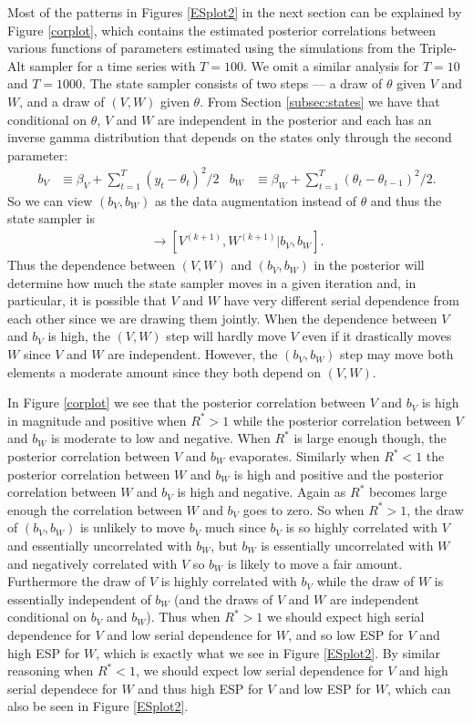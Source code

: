 \documentclass{article}
\begin{document}
\setcounter{figure}{0}    

Most of the patterns in Figures \ref{ESplot2} in the next section can be explained by Figure \ref{corplot}, which contains the estimated posterior correlations between various functions of parameters estimated using the simulations from the Triple-Alt sampler for a time series with $T=100$. We omit a similar analysis for $T=10$ and $T=1000$. The state sampler consists of two steps --- a draw of $\theta$ given $V$ and $W$, and a draw of $(V,W)$ given $\theta$. From Section \ref{subsec:states} we have that conditional on $\theta$, $V$ and $W$ are independent in the posterior and each has an inverse gamma distribution that depends on the states only through the second parameter:
\begin{align*}
  b_V &\equiv \beta_V + \sum_{t=1}^T(y_t - \theta_t)^2/2 &
  b_W &\equiv \beta_W + \sum_{t=1}^T(\theta_t - \theta_{t-1})^2/2.
\end{align*}
So we can view $(b_V,b_W)$ as the data augmentation instead of $\theta$ and thus the state sampler is
\begin{align*}
  [b_V, b_W|V^{(k)},W^{(k)}] \to [V^{(k+1)},W^{(k+1)}|b_V,b_W].
\end{align*}
Thus the dependence between $(V,W)$ and $(b_V,b_W)$ in the posterior will determine how much the state sampler moves in a given iteration and, in particular, it is possible that $V$ and $W$ have very different serial dependence from each other since we are drawing them jointly. When the dependence between $V$ and $b_V$ is high, the $(V,W)$ step will hardly move $V$ even if it drastically moves $W$ since $V$ and $W$ are independent. However, the $(b_V,b_W)$ step may move both elements a moderate amount since they both depend on $(V,W)$.

In Figure \ref{corplot} we see that the posterior correlation between $V$ and $b_V$ is high in magnitude and positive when $R^*>1$ while the posterior correlation between $V$ and $b_W$ is moderate to low and negative. When $R^*$ is large enough though, the posterior correlation between $V$ and $b_W$ evaporates. Similarly when $R^*<1$ the posterior correlation between $W$ and $b_W$ is high and positive and the posterior correlation between $W$ and $b_V$ is high and negative. Again as $R^*$ becomes large enough the correlation between $W$ and $b_V$ goes to zero. So when $R^*>1$, the draw of $(b_V, b_W)$ is unlikely to move $b_V$ much since $b_V$ is so highly correlated with $V$ and essentially uncorrelated with $b_W$, but $b_W$ is essentially uncorrelated with $W$ and negatively correlated with $V$ so $b_W$ is likely to move a fair amount. Furthermore the draw of $V$ is highly correlated with $b_V$ while the draw of $W$ is essentially independent of $b_W$ (and the draws of $V$ and $W$ are independent conditional on $b_V$ and $b_W$). Thus when $R^*>1$ we should expect high serial dependence for $V$ and low serial dependence for $W$, and so low ESP for $V$ and high ESP for $W$, which is exactly what we see in Figure \ref{ESplot2}. By similar reasoning when $R^*<1$, we should expect low serial dependence for $V$ and high serial dependece for $W$ and thus high ESP for $V$ and low ESP for $W$, which can also be seen in Figure \ref{ESplot2}.
\end{document}
